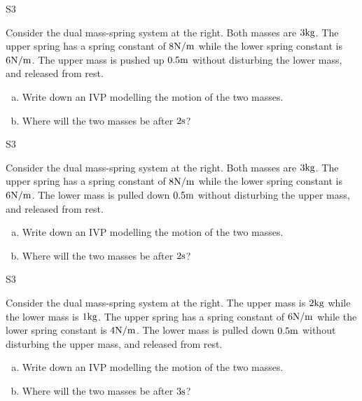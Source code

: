 \begin{problem}{S3}
\begin{minipage}[t]{0.8\linewidth}
Consider the dual mass-spring system at the right.  Both masses are \(3 {\rm kg}\).  The upper spring has a spring constant of \( 8 {\rm N/m}\) while the lower spring constant is \(6 {\rm N/m}\).  The upper mass is pushed up \(0.5 {\rm m}\) without disturbing the lower mass, and released from rest. 
\begin{enumerate}[(a)]
\item Write down an IVP modelling the motion of the two masses.
\item Where will the two masses be after \(2 {\rm s}\)?
\end{enumerate}
\end{minipage}
\hfill
\springdoublemassQuiz[0.7]
\hfill
\end{problem}

\begin{problem}{S3}
\begin{minipage}[t]{0.8\linewidth}
Consider the dual mass-spring system at the right.  Both masses are \(3 {\rm kg}\).  The upper spring has a spring constant of \( 8 {\rm N/m}\) while the lower spring constant is \(6 {\rm N/m}\).  The lower mass is pulled down \(0.5 {\rm m}\) without disturbing the upper mass, and released from rest. 
\begin{enumerate}[(a)]
\item Write down an IVP modelling the motion of the two masses.
\item Where will the two masses be after \(2 {\rm s}\)?
\end{enumerate}
\end{minipage}
\hfill
\springdoublemassQuiz[0.7]
\hfill
\end{problem}

\begin{problem}{S3}
\begin{minipage}[t]{0.8\linewidth}
Consider the dual mass-spring system at the right.  The upper mass is \(2 {\rm kg}\) while the lower mass is \(1 {\rm kg}\).  The upper spring has a spring constant of \( 6 {\rm N/m}\) while the lower spring constant is \(4 {\rm N/m}\).  The lower mass is pulled down \(0.5 {\rm m}\) without disturbing the upper mass, and released from rest. 
\begin{enumerate}[(a)]
\item Write down an IVP modelling the motion of the two masses.
\item Where will the two masses be after \(3 {\rm s}\)?
\end{enumerate}
\end{minipage}
\hfill
\springdoublemassQuiz[0.7]
\hfill
\end{problem}

